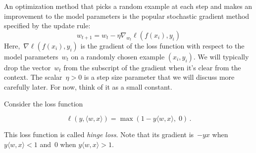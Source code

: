 \documentclass{tufte-book}
\begin{document}
An optimization method that picks a random example at each step and
makes an improvement to the model parameters is the popular stochastic
gradient method specified by the update rule: \[
w_{t+1} = w_t - \eta\nabla_{w_t} \ell(f(x_i), y_i)
\] Here,~\(\nabla \ell(f(x_i), y_i)\) is the gradient of the loss
function with respect to the model parameters~\(w_t\) on a randomly
chosen example \((x_i, y_i)\). We will typically drop the vector~\(w_t\)
from the subscript of the gradient when it's clear from the context. The
scalar~\(\eta>0\) is a step size parameter that we will discuss more
carefully later. For now, think of it as a small constant.

Consider the loss function

\[
\ell(y, \langle w, x\rangle)
= \max(1-y\langle w, x\rangle,\; 0)\,.
\]


This loss function is called \emph{hinge loss}. Note
that its gradient is~\(-yx\) when~\(y\langle w, x\rangle < 1\) and~\(0\)
when \(y\langle w, x\rangle >1\).
\end{document}
